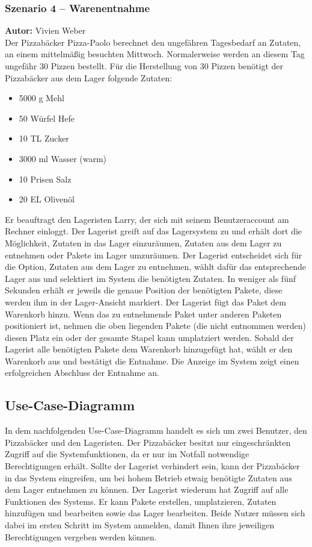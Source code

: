 \subsubsection{Szenario 4 – Warenentnahme}
\textbf{Autor:} Vivien Weber\\
Der Pizzabäcker Pizza-Paolo berechnet den ungefähren Tagesbedarf an Zutaten, an einem mittelmäßig besuchten Mittwoch.
Normalerweise werden an diesem Tag ungefähr 30 Pizzen bestellt. Für die Herstellung von 30 Pizzen benötigt der
Pizzabäcker aus dem Lager folgende Zutaten:

\begin{itemize}
    \item 5000 g Mehl
    \item 50 Würfel Hefe
    \item 10 TL Zucker
    \item 3000 ml Wasser (warm)
    \item 10 Prisen Salz
    \item 20 EL Olivenöl
\end{itemize}

Er beauftragt den Lageristen Larry, der sich mit seinem Benutzeraccount am Rechner einloggt. Der Lagerist greift auf das Lagersystem
zu und erhält dort die Möglichkeit, Zutaten in das Lager einzuräumen, Zutaten aus dem Lager zu entnehmen oder
Pakete im Lager umzuräumen. Der Lagerist entscheidet sich für die Option, Zutaten aus dem Lager zu entnehmen,
wählt dafür das entsprechende Lager aus und selektiert im System die benötigten Zutaten. In weniger als fünf Sekunden
erhält er jeweils die genaue Position der benötigten Pakete, diese werden ihm in der Lager-Ansicht markiert. Der
Lagerist fügt das Paket dem Warenkorb hinzu. Wenn das zu entnehmende Paket unter anderen Paketen
positioniert ist, nehmen die oben liegenden Pakete (die nicht entnommen werden) diesen Platz ein oder der gesamte Stapel kann umplatziert werden.
Sobald der Lagerist alle benötigten Pakete dem Warenkorb hinzugefügt hat, wählt er den Warenkorb aus und bestätigt die
Entnahme. Die Anzeige im System zeigt einen erfolgreichen Abschluss der Entnahme an.

\subsection{Use-Case-Diagramm}\label{subsec:user_case_beschreibungen}
In dem nachfolgenden Use-Case-Diagramm handelt es sich um zwei Benutzer, den Pizzabäcker und den Lageristen. Der
Pizzabäcker besitzt nur eingeschränkten Zugriff auf die Systemfunktionen, da er nur im Notfall notwendige Berechtigungen erhält.
Sollte der Lagerist verhindert sein, kann der Pizzabäcker in das System eingreifen, um bei hohem Betrieb etwaig benötigte Zutaten
aus dem Lager entnehmen zu können. Der Lagerist wiederum hat Zugriff auf alle Funktionen des Systems. Er kann Pakete
erstellen, umplatzieren, Zutaten hinzufügen und bearbeiten sowie das Lager bearbeiten. Beide Nutzer müssen sich dabei im
ersten Schritt im System anmelden, damit Ihnen ihre jeweiligen Berechtigungen vergeben werden können.

